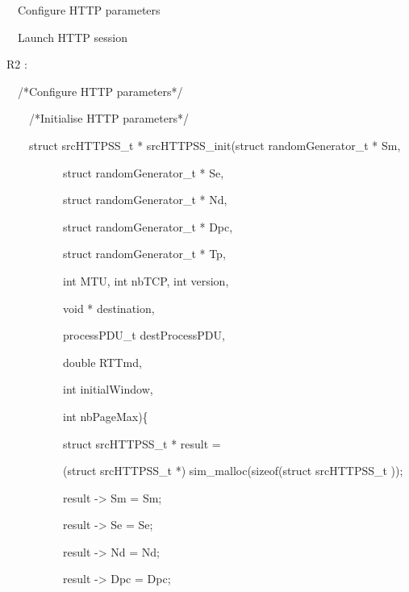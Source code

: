 \documentclass[a4paper]{article}
\begin{document}
{
\ \ Configure HTTP parameters}

{
\ \ Launch HTTP session}


\bigskip

{
R2 :}

{
\ \ /*Configure HTTP parameters*/}

{
\ \ \ \ /*Initialise HTTP parameters*/}

{
\ \ \ \ struct srcHTTPSS\_t * srcHTTPSS\_init(struct randomGenerator\_t
* Sm,}

{
\ \ \ \ \ \ \ \ \ \ struct randomGenerator\_t * Se,}

{
\ \ \ \ \ \ \ \ \ \ struct randomGenerator\_t * Nd,}

{
\ \ \ \ \ \ \ \ \ \ struct randomGenerator\_t * Dpc,}

{
\ \ \ \ \ \ \ \ \ \ struct randomGenerator\_t * Tp,}

{
\ \ \ \ \ \ \ \ \ \ int MTU, int nbTCP, int version,}

{
\ \ \ \ \ \ \ \ \ \ void * destination,}

{
\ \ \ \ \ \ \ \ \ \ processPDU\_t destProcessPDU,}

{
\ \ \ \ \ \ \ \ \ \ double RTTmd,}

{
\ \ \ \ \ \ \ \ \ \ int initialWindow,}

{
\ \ \ \ \ \ \ \ \ \ int nbPageMax)\{\ \ }

{
\ \ \ \ \ \ \ \ \ \ struct srcHTTPSS\_t * result = }

{
\ \ \ \ \ \ \ \ \ \ (struct srcHTTPSS\_t *) sim\_malloc(sizeof(struct srcHTTPSS\_t
));}


\bigskip

{
\ \ \ \ \ \ \ \ \ \ result -{\textgreater} Sm = Sm;}

{
\ \ \ \ \ \ \ \ \ \ result -{\textgreater} Se = Se;}

{
\ \ \ \ \ \ \ \ \ \ result -{\textgreater} Nd = Nd;}

{
\ \ \ \ \ \ \ \ \ \ result -{\textgreater} Dpc = Dpc;}
\end{document}
